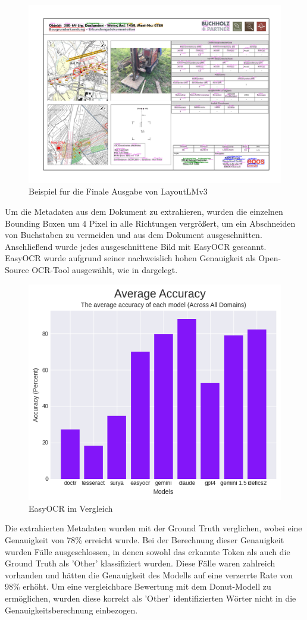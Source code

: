 \documentclass[12pt,a4paper,twoside]{article}
\begin{document}
\begin{figure}
    \centering
    \includegraphics[width=0.9\linewidth]{LayoutLMv3-results.png}
    \caption{Beispiel fur die Finale Ausgabe von LayoutLMv3}
    \label{fig:enter-label}
\end{figure}
Um die Metadaten aus dem Dokument zu extrahieren, wurden die einzelnen Bounding Boxen um 4 Pixel in alle Richtungen vergrößert, um ein Abschneiden von Buchstaben zu vermeiden und aus dem Dokument ausgeschnitten. Anschließend wurde jedes ausgeschnittene Bild mit EasyOCR gescannt. EasyOCR wurde aufgrund seiner nachweislich hohen Genauigkeit als Open-Source OCR-Tool ausgewählt, wie in \cite{Layoutlmv3-easyocr} dargelegt.

\begin{figure}[H]
    \centering
    \includegraphics[width=0.5\linewidth]{LayoutLMv3-easyocr-comparisson.png}
    \caption{EasyOCR im Vergleich}
    \label{fig:enter-label}
\end{figure}

Die extrahierten Metadaten wurden mit der Ground Truth verglichen, wobei eine Genauigkeit von 78\% erreicht wurde. Bei der Berechnung dieser Genauigkeit wurden Fälle ausgeschlossen, in denen sowohl das erkannte Token als auch die Ground Truth als 'Other' klassifiziert wurden. Diese Fälle waren zahlreich vorhanden und hätten die Genauigkeit des Modells auf eine verzerrte Rate von 98\% erhöht. Um eine vergleichbare Bewertung mit dem Donut-Modell zu ermöglichen, wurden diese korrekt als 'Other' identifizierten Wörter nicht in die Genauigkeitsberechnung einbezogen.
\end{document}
